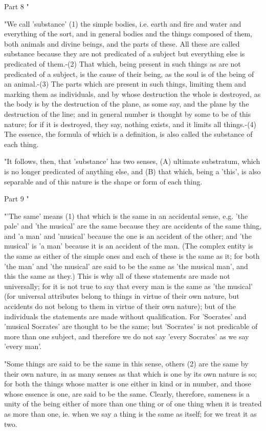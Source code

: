 Part 8 "

"We call 'substance' (1) the simple bodies, i.e. earth and fire and
water and everything of the sort, and in general bodies and the things
composed of them, both animals and divine beings, and the parts of
these. All these are called substance because they are not predicated
of a subject but everything else is predicated of them.-(2) That which,
being present in such things as are not predicated of a subject, is
the cause of their being, as the soul is of the being of an animal.-(3)
The parts which are present in such things, limiting them and marking
them as individuals, and by whose destruction the whole is destroyed,
as the body is by the destruction of the plane, as some say, and the
plane by the destruction of the line; and in general number is thought
by some to be of this nature; for if it is destroyed, they say, nothing
exists, and it limits all things.-(4) The essence, the formula of
which is a definition, is also called the substance of each thing.

"It follows, then, that 'substance' has two senses, (A) ultimate substratum,
which is no longer predicated of anything else, and (B) that which,
being a 'this', is also separable and of this nature is the shape
or form of each thing. 

Part 9 "

"'The same' means (1) that which is the same in an accidental sense,
e.g. 'the pale' and 'the musical' are the same because they are accidents
of the same thing, and 'a man' and 'musical' because the one is an
accident of the other; and 'the musical' is 'a man' because it is
an accident of the man. (The complex entity is the same as either
of the simple ones and each of these is the same as it; for both 'the
man' and 'the musical' are said to be the same as 'the musical man',
and this the same as they.) This is why all of these statements are
made not universally; for it is not true to say that every man is
the same as 'the musical' (for universal attributes belong to things
in virtue of their own nature, but accidents do not belong to them
in virtue of their own nature); but of the individuals the statements
are made without qualification. For 'Socrates' and 'musical Socrates'
are thought to be the same; but 'Socrates' is not predicable of more
than one subject, and therefore we do not say 'every Socrates' as
we say 'every man'. 

"Some things are said to be the same in this sense, others (2) are
the same by their own nature, in as many senses as that which is one
by its own nature is so; for both the things whose matter is one either
in kind or in number, and those whose essence is one, are said to
be the same. Clearly, therefore, sameness is a unity of the being
either of more than one thing or of one thing when it is treated as
more than one, ie. when we say a thing is the same as itself; for
we treat it as two. 

